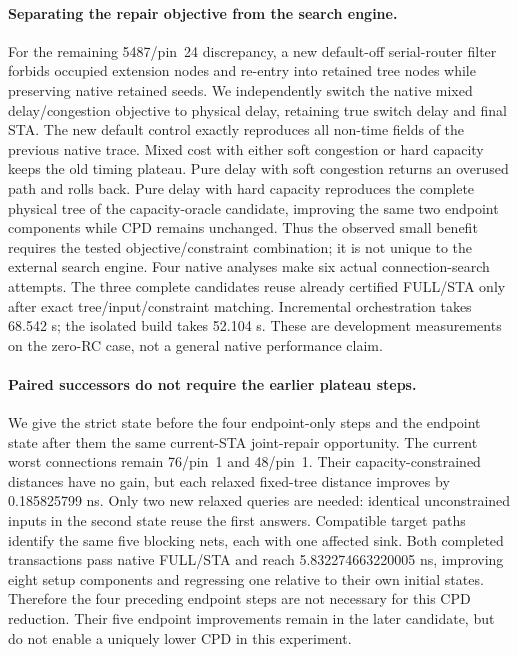 \paragraph{Separating the repair objective from the search engine.}
For the remaining 5487/pin~24 discrepancy, a new default-off serial-router filter forbids occupied extension nodes and re-entry into retained tree nodes while preserving native retained seeds. We independently switch the native mixed delay/congestion objective to physical delay, retaining true switch delay and final STA. The new default control exactly reproduces all non-time fields of the previous native trace. Mixed cost with either soft congestion or hard capacity keeps the old timing plateau. Pure delay with soft congestion returns an overused path and rolls back. Pure delay with hard capacity reproduces the complete physical tree of the capacity-oracle candidate, improving the same two endpoint components while CPD remains unchanged. Thus the observed small benefit requires the tested objective/constraint combination; it is not unique to the external search engine. Four native analyses make six actual connection-search attempts. The three complete candidates reuse already certified FULL/STA only after exact tree/input/constraint matching. Incremental orchestration takes 68.542 s; the isolated build takes 52.104 s. These are development measurements on the zero-RC case, not a general native performance claim.

\paragraph{Paired successors do not require the earlier plateau steps.}
We give the strict state before the four endpoint-only steps and the endpoint state after them the same current-STA joint-repair opportunity. The current worst connections remain 76/pin~1 and 48/pin~1. Their capacity-constrained distances have no gain, but each relaxed fixed-tree distance improves by 0.185825799 ns. Only two new relaxed queries are needed: identical unconstrained inputs in the second state reuse the first answers. Compatible target paths identify the same five blocking nets, each with one affected sink. Both completed transactions pass native FULL/STA and reach 5.832274663220005 ns, improving eight setup components and regressing one relative to their own initial states. Therefore the four preceding endpoint steps are not necessary for this CPD reduction. Their five endpoint improvements remain in the later candidate, but do not enable a uniquely lower CPD in this experiment.

